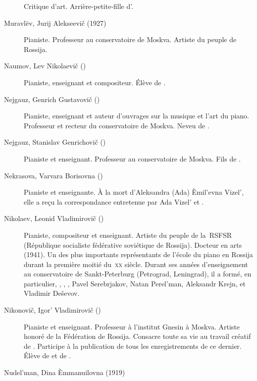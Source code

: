 \begin{description}
 Critique d'art.
 Arrière-petite-fille d'\ARubinstein{}.
 \item[Muravlëv, Jurij Alekseevič (1927\dvsborn{})]%
 Pianiste.
 Professeur au conservatoire de Moskva.
 Artiste du peuple de Rossija.
 \item[Naumov, Lev Nikolaevič (\Dates{1925}{2005})]%
 Pianiste, enseignant et compositeur.
 Élève de \HNeuhaus{}.
 \item[Nejgauz, Genrich Gustavovič (\Dates{1888}{1964})]%
 Pianiste, enseignant et auteur d'ouvrages sur la musique et l'art du piano.
 Professeur et recteur du conservatoire de Moskva.
 Neveu de \FBlumenfeld{}.
 \item[Nejgauz, Stanislav Genrichovič (\Dates{1927}{1980})]%
 Pianiste et enseignant.
 Professeur au conservatoire de Moskva.
 Fils de \HNeuhaus{}.
 \item[Nekrasova, Varvara Borisovna (\Dates{1909}{1997})]%
 Pianiste et enseignante.
 À la mort d'\hbox{Aleksandra} (Ada) Èmil'evna Vizel', elle a reçu la
 correspondance entretenue par Ada Vizel' et \VSofronitsky{}.
 \item[Nikolaev, Leonid Vladimirovič (\Dates{1878}{1942})]%
 Pianiste, compositeur et enseignant.
 Artiste du peuple de la~RSFSR (République socialiste fédérative soviétique
 de Rossija).
 Docteur en arts (1941).
 Un des plus importants représentants de l'école du piano en Rossija durant
 la première moitié du~\textsc{xx}\ieme{} siècle.
 Durant ses années d'enseignement au conservatoire de Sankt-Peterburg
 (Petrograd, Leningrad), il a formé, en particulier, \VSofronitsky{},
 \DChostakovitch{}, \MYudina{}, Pavel Serebrjakov, Natan Perel'man,
 Aleksandr Krejn, \VBogdanovBerezovsky{} et Vladimir Deševov.
 \item[Nikonovič, Igor' Vladimirovič (\Dates{1935}{2012})]%
 Pianiste et enseignant.
 Professeur à l'institut Gnesin à Moskva.
 Artiste honoré de la Fédération de Rossija.
 Consacre toute sa vie au travail créatif de \VSofronitsky{}.
 Participe à la publication de tous les enregistrements de ce dernier.
 Élève de \HNeuhaus{} et de \VSofronitsky{}.
 \item[Nudel'man, Dina Èmmanuilovna (1919\dvsborn{})]%

\end{description}
